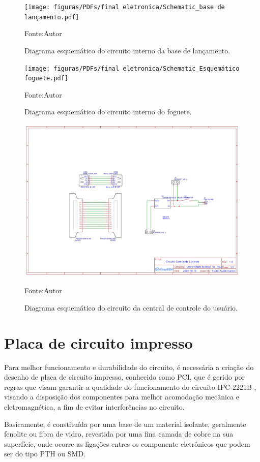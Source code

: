\begin{figure}[H]
  \centering
  \texttt{[image: figuras/PDFs/final eletronica/Schematic\_base de lançamento.pdf]}
  \caption{Diagrama esquemático do circuito interno da base de lançamento.} 
  {\footnotesize Fonte:Autor} 
  \label{fig:Diagrama esquematico do circuito interno da base de lancamento}
\end{figure}

\begin{figure}[H]
  \centering
  \texttt{[image: figuras/PDFs/final eletronica/Schematic\_Esquemático foguete.pdf]}
  \caption{Diagrama esquemático do circuito interno do foguete. } 
  {\footnotesize Fonte:Autor} 
  \label{fig:Diagrama esquematico do circuito interno do foguete}
\end{figure}

\begin{figure}[H]
  \centering
  \includegraphics[scale=0.35]{figuras/PDFs/final eletronica/Schematic_maleta final.pdf}
  \caption{Diagrama esquemático do circuito da central de controle do usuário.} 
  {\footnotesize Fonte:Autor} 
  \label{fig:Diagrama esquemático do circuito da central de controle do usuário}
\end{figure}

\section{Placa de circuito impresso}

\par Para melhor funcionamento  e durabilidade do circuito, é necessária a criação do desenho de placa de circuito impresso, conhecido como PCI, que é gerido por regras que visam garantir a qualidade do funcionamento do circuito IPC-2221B \cite{IPC-2221}, visando a disposição dos componentes para melhor acomodação mecânica e eletromagnética, a fim de evitar interferências no circuito.
\par Basicamente, é constituída por uma base de um material isolante, geralmente fenolite ou fibra de vidro, revestida por uma fina camada de cobre na sua superfície, onde ocorre as ligações entres os componente eletrônicos que podem ser do tipo PTH ou SMD\cite{pci}. 

